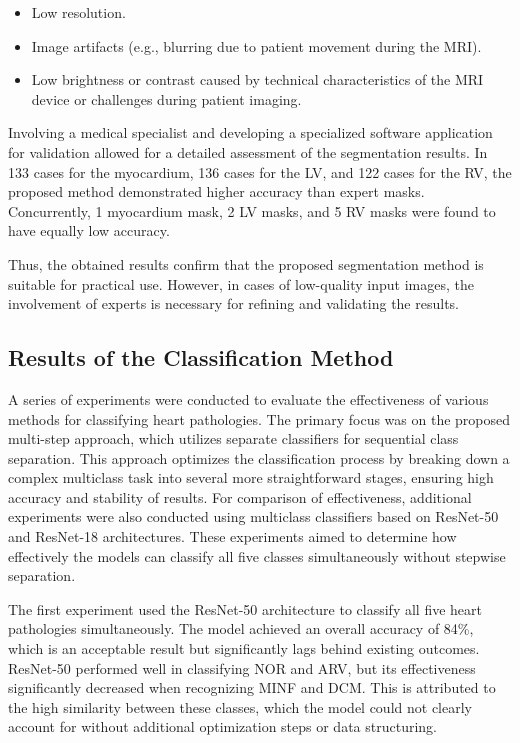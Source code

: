 \documentclass[fleqn,10pt]{wlscirep}
\begin{document}
\begin{itemize}
    \item Low resolution.
    \item Image artifacts (e.g., blurring due to patient movement during the MRI).
    \item Low brightness or contrast caused by technical characteristics of the MRI device or challenges during patient imaging.
\end{itemize}

Involving a medical specialist and developing a specialized software application for validation allowed for a detailed assessment of the segmentation results. In 133 cases for the myocardium, 136 cases for the LV, and 122 cases for the RV, the proposed method demonstrated higher accuracy than expert masks. Concurrently, 1 myocardium mask, 2 LV masks, and 5 RV masks were found to have equally low accuracy.

Thus, the obtained results confirm that the proposed segmentation method is suitable for practical use. However, in cases of low-quality input images, the involvement of experts is necessary for refining and validating the results.

\subsection*{Results of the Classification Method}

A series of experiments were conducted to evaluate the effectiveness of various methods for classifying heart pathologies. The primary focus was on the proposed multi-step approach, which utilizes separate classifiers for sequential class separation. This approach optimizes the classification process by breaking down a complex multiclass task into several more straightforward stages, ensuring high accuracy and stability of results. For comparison of effectiveness, additional experiments were also conducted using multiclass classifiers based on ResNet-50 and ResNet-18 architectures. These experiments aimed to determine how effectively the models can classify all five classes simultaneously without stepwise separation.

The first experiment used the ResNet-50 architecture to classify all five heart pathologies simultaneously. The model achieved an overall accuracy of 84\%, which is an acceptable result but significantly lags behind existing outcomes. ResNet-50 performed well in classifying NOR and ARV, but its effectiveness significantly decreased when recognizing MINF and DCM. This is attributed to the high similarity between these classes, which the model could not clearly account for without additional optimization steps or data structuring.
\end{document}

